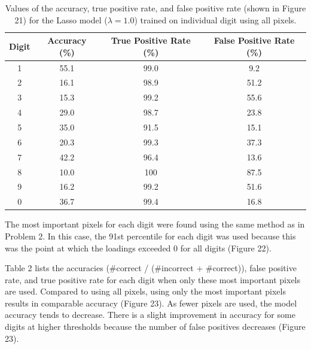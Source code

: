 \documentclass[10pt]{article}
\begin{document}
\begin{table}[ht]
\caption{Values of the accuracy, true positive rate, and false positive rate (shown in Figure 21) for the Lasso model ($\lambda=1.0$) trained on individual digit using all pixels.}
\label{table1}
\begin{tabular}{|c|c|c|c|}
\hline
Digit & Accuracy (\%) & True Positive Rate (\%) & False Positive Rate (\%) \\ \hline
1     & 55.1          & 99.0                    & 9.2                      \\ \hline
2     & 16.1          & 98.9                    & 51.2                     \\ \hline
3     & 15.3          & 99.2                    & 55.6                     \\ \hline
4     & 29.0          & 98.7                    & 23.8                     \\ \hline
5     & 35.0          & 91.5                    & 15.1                     \\ \hline
6     & 20.3          & 99.3                    & 37.3                     \\ \hline
7     & 42.2          & 96.4                    & 13.6                     \\ \hline
8     & 10.0          & 100                     & 87.5                     \\ \hline
9     & 16.2          & 99.2                    & 51.6                     \\ \hline
0     & 36.7          & 99.4                    & 16.8                     \\ \hline
\end{tabular}
\end{table}

The most important pixels for each digit were found using the same method as in Problem 2. In this case, the 91st percentile for each digit was used because this was the point at which the loadings exceeded 0 for all digits (Figure 22). %

Table 2 lists the accuracies (\#correct / (\#incorrect + \#correct)), false positive rate, and true positive rate for each digit when only these most important pixels are used. Compared to using all pixels, using only the most important pixels results in comparable accuracy (Figure 23). As fewer pixels are used, the model accuracy tends to decrease. There is a slight improvement in accuracy for some digits at higher thresholds because the number of false positives decreases (Figure 23). %
\end{document}
